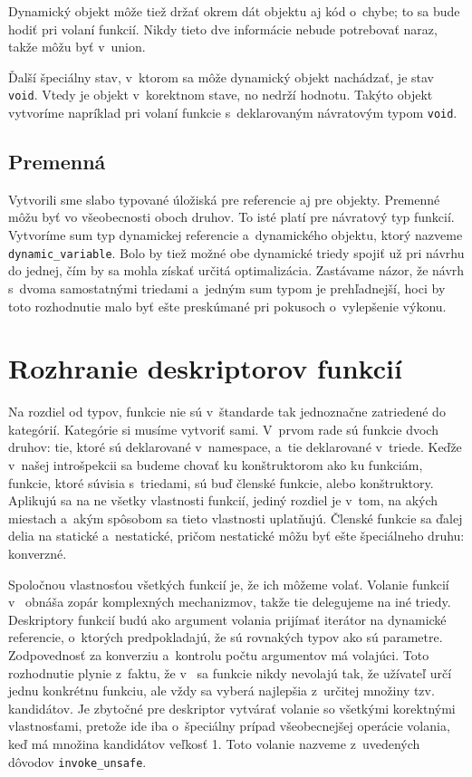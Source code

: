 Dynamický objekt môže tiež držať okrem dát objektu aj kód o~chybe; to sa bude hodiť pri volaní funkcií. Nikdy tieto dve informácie nebude potrebovať naraz, takže môžu byť v~union.

Ďalší špeciálny stav, v~ktorom sa môže dynamický objekt nachádzať, je stav \texttt{void}. Vtedy je objekt v~korektnom stave, no nedrží hodnotu. Takýto objekt vytvoríme napríklad pri volaní funkcie s~deklarovaným návratovým typom \texttt{void}.

\subsection{Premenná}

Vytvorili sme slabo typované úložiská pre referencie aj pre objekty. Premenné môžu byť vo všeobecnosti oboch druhov. To isté platí pre návratový typ funkcií. Vytvoríme sum typ dynamickej referencie a~dynamického objektu, ktorý nazveme \texttt{dynamic\_variable}. Bolo by tiež možné obe dynamické triedy spojiť už pri návrhu do jednej, čím by sa mohla získať určitá optimalizácia. Zastávame názor, že návrh s~dvoma samostatnými triedami a~jedným sum typom je prehľadnejší, hoci by toto rozhodnutie malo byť ešte preskúmané pri pokusoch o~vylepšenie výkonu.

\section{Rozhranie deskriptorov funkcií}

Na rozdiel od typov, funkcie nie sú v~štandarde tak jednoznačne zatriedené do kategórií. Kategórie si musíme vytvoriť sami. V~prvom rade sú funkcie dvoch druhov: tie, ktoré sú deklarované v~namespace, a~tie deklarované v~triede. Keďže v~našej introšpekcii sa budeme chovať ku konštruktorom ako ku funkciám, funkcie, ktoré súvisia s~triedami, sú buď členské funkcie, alebo konštruktory. Aplikujú sa na ne všetky vlastnosti funkcií, jediný rozdiel je v~tom, na akých miestach a~akým spôsobom sa tieto vlastnosti uplatňujú. Členské funkcie sa ďalej delia na statické a~nestatické, pričom nestatické môžu byť ešte špeciálneho druhu: konverzné.

Spoločnou vlastnosťou všetkých funkcií je, že ich môžeme volať. Volanie funk\-cií v~\Cpp{} obnáša zopár komplexných mechanizmov, takže tie delegujeme na iné triedy. Deskriptory funkcií budú ako argument volania prijímať iterátor na dynamické referencie, o~ktorých predpokladajú, že sú rovnakých typov ako sú parametre. Zodpovednosť za konverziu a~kontrolu počtu argumentov má volajúci. Toto rozhodnutie plynie z~faktu, že v~\Cpp{} sa funkcie nikdy nevolajú tak, že užívateľ určí jednu konkrétnu funkciu, ale vždy sa vyberá najlepšia z~určitej množiny tzv. kandidátov. Je zbytočné pre deskriptor vytvárať volanie so všetkými korektnými vlastnosťami, pretože ide iba o~špeciálny prípad všeobecnejšej operácie volania, keď má množina kandidátov veľkosť 1. Toto volanie nazveme z~uvedených dôvodov \texttt{invoke\_unsafe}.

